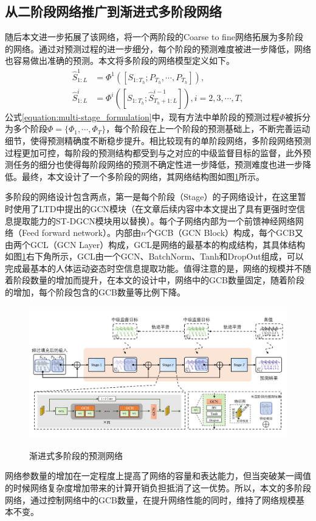 \subsection{从二阶段网络推广到渐进式多阶段网络}
随后本文进一步拓展了该网络，将一个两阶段的Coarse to fine网络拓展为多阶段的网络。通过对预测过程的进一步细分，每个阶段的预测难度被进一步降低，网络也容易做出准确的预测。本文将多阶段的网络模型定义如下。
\begin{equation}
    \begin{aligned}
         \hat{S}_{1:L}^{1} &= \Phi^1([{S}_{1:T_h};P_{T_h},\cdots,P_{T_h}]), \\
        \hat{S}_{1:L}^{i} &= \Phi^i([S_{1:T_h};\hat{S}_{T_h+1:L}^{i-1}]), i = {2,3,\cdots,T},
    \end{aligned}
    \label{equation:multi-stage_formulation}
\end{equation}
公式\ref{equation:multi-stage_formulation}中，现有方法中单阶段的预测过程$\Phi$被拆分为多个阶段$\Phi = \{ \Phi_1, \cdots, \Phi_T\}$，每个阶段在上一个阶段的预测基础上，不断完善运动细节，使得预测精确度不断稳步提升。相比较现有的单阶段网络，多阶段网络预测过程更加可控，每阶段的预测结构都受到与之对应的中级监督目标的监督，此外预测任务的细分也使得每阶段网络的预测不确定性进一步降低，预测难度也进一步降低。最终，本文设计了一个多阶段的网络，其网络结构图如图\ref{fig:multi_stage}所示。

多阶段的网络设计包含两点，第一是每个阶段（Stage）的子网络设计，在这里暂时使用了LTD中提出的GCN模块（在文章后续内容中本文提出了具有更强时空信息提取能力的ST-DGCN模块用以替换）。每个子网络内部为一个前馈神经网络网络（Feed forward network）。内部由$n$个GCB（GCN Block）构成，每个GCB又由两个GCL（GCN Layer）构成，GCL是网络的最基本的构成结构，其具体结构如图\ref{fig:multi_stage}右下角所示，GCL由一个GCN、BatchNorm、Tanh和DropOut组成，可以完成最基本的人体运动姿态时空信息提取功能。值得注意的是，网络的规模并不随着阶段数量的增加而提升，在本文的设计中，网络中的GCB数量固定，随着阶段的增加，每个阶段包含的GCB数量等比例下降。
\begin{figure}[ht]
    \centering
    \includegraphics[width=1\textwidth]{FigMa/multi-stage_network.png}\\
    \vspace{-0.3cm}
    \caption{渐进式多阶段的预测网络}
    \label{fig:multi_stage}
\end{figure}
网络参数量的增加在一定程度上提高了网络的容量和表达能力，但当突破某一阈值的时候网络复杂度增加带来的计算开销负担抵消了这一优势。所以，本文的多阶段网络，通过控制网络中的GCB数量，在提升网络性能的同时，维持了网络规模基本不变。

